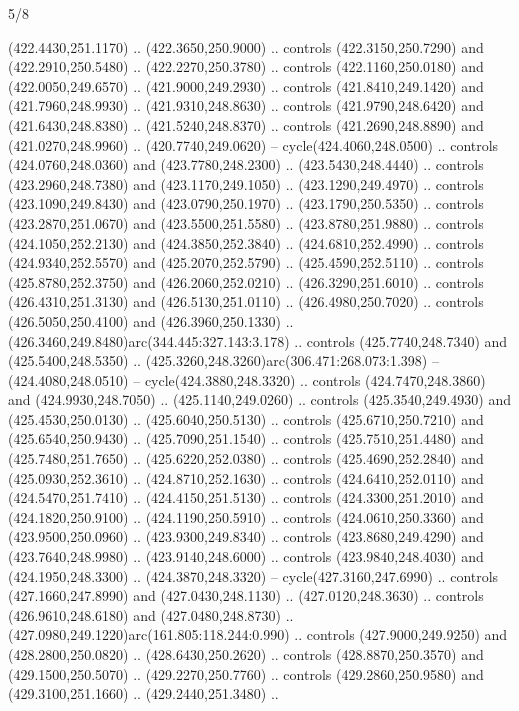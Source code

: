 \begin{flagdescription}{5/8}
\begin{scope}[xshift=0.5\flaglength,yshift=0.5\flagwidth,scale=\flagwidth/475.63]
\begin{scope}[y=0.8pt, x=0.8pt, yscale=-1, xscale=1,shift={(-450,-300)}]
\begin{scope}[cm={{1.0,0.0,0.0,1.0,(-0.0002,0.12556)}},cm={{1.0,0.0,0.0,1.0,(0.00179,0.0)}}]
\begin{scope}[cm={{1.00926,0.0,0.0,1.00926,(-3.1541,-2.47648)}}]
  (422.4430,251.1170) .. (422.3650,250.9000) .. controls (422.3150,250.7290) and
  (422.2910,250.5480) .. (422.2270,250.3780) .. controls (422.1160,250.0180) and
  (422.0050,249.6570) .. (421.9000,249.2930) .. controls (421.8410,249.1420) and
  (421.7960,248.9930) .. (421.9310,248.8630) .. controls (421.9790,248.6420) and
  (421.6430,248.8380) .. (421.5240,248.8370) .. controls (421.2690,248.8890) and
  (421.0270,248.9960) .. (420.7740,249.0620) -- cycle(424.4060,248.0500) ..
  controls (424.0760,248.0360) and (423.7780,248.2300) .. (423.5430,248.4440) ..
  controls (423.2960,248.7380) and (423.1170,249.1050) .. (423.1290,249.4970) ..
  controls (423.1090,249.8430) and (423.0790,250.1970) .. (423.1790,250.5350) ..
  controls (423.2870,251.0670) and (423.5500,251.5580) .. (423.8780,251.9880) ..
  controls (424.1050,252.2130) and (424.3850,252.3840) .. (424.6810,252.4990) ..
  controls (424.9340,252.5570) and (425.2070,252.5790) .. (425.4590,252.5110) ..
  controls (425.8780,252.3750) and (426.2060,252.0210) .. (426.3290,251.6010) ..
  controls (426.4310,251.3130) and (426.5130,251.0110) .. (426.4980,250.7020) ..
  controls (426.5050,250.4100) and (426.3960,250.1330) ..
  (426.3460,249.8480)arc(344.445:327.143:3.178) .. controls (425.7740,248.7340)
  and (425.5400,248.5350) .. (425.3260,248.3260)arc(306.471:268.073:1.398) --
  (424.4080,248.0510) -- cycle(424.3880,248.3320) .. controls
  (424.7470,248.3860) and (424.9930,248.7050) .. (425.1140,249.0260) .. controls
  (425.3540,249.4930) and (425.4530,250.0130) .. (425.6040,250.5130) .. controls
  (425.6710,250.7210) and (425.6540,250.9430) .. (425.7090,251.1540) .. controls
  (425.7510,251.4480) and (425.7480,251.7650) .. (425.6220,252.0380) .. controls
  (425.4690,252.2840) and (425.0930,252.3610) .. (424.8710,252.1630) .. controls
  (424.6410,252.0110) and (424.5470,251.7410) .. (424.4150,251.5130) .. controls
  (424.3300,251.2010) and (424.1820,250.9100) .. (424.1190,250.5910) .. controls
  (424.0610,250.3360) and (423.9500,250.0960) .. (423.9300,249.8340) .. controls
  (423.8680,249.4290) and (423.7640,248.9980) .. (423.9140,248.6000) .. controls
  (423.9840,248.4030) and (424.1950,248.3300) .. (424.3870,248.3320) --
  cycle(427.3160,247.6990) .. controls (427.1660,247.8990) and
  (427.0430,248.1130) .. (427.0120,248.3630) .. controls (426.9610,248.6180) and
  (427.0480,248.8730) .. (427.0980,249.1220)arc(161.805:118.244:0.990) ..
  controls (427.9000,249.9250) and (428.2800,250.0820) .. (428.6430,250.2620) ..
  controls (428.8870,250.3570) and (429.1500,250.5070) .. (429.2270,250.7760) ..
  controls (429.2860,250.9580) and (429.3100,251.1660) .. (429.2440,251.3480) ..

\end{scope}
\end{scope}
\end{scope}
\end{scope}
\end{flagdescription}
